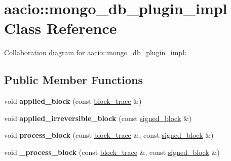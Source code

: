 \hypertarget{classaacio_1_1mongo__db__plugin__impl}{}\section{aacio\+:\+:mongo\+\_\+db\+\_\+plugin\+\_\+impl Class Reference}
\label{classaacio_1_1mongo__db__plugin__impl}


Collaboration diagram for aacio\+:\+:mongo\+\_\+db\+\_\+plugin\+\_\+impl\+:
\subsection*{Public Member Functions}
\begin{DoxyCompactItemize}
\item 
\mbox{\label{classaacio_1_1mongo__db__plugin__impl_a9fdf45ed19fc31c0c6c5b1d55e9a9f2f}} 
void {\bfseries applied\+\_\+block} (const \mbox{\hyperlink{structaacio_1_1chain_1_1block__trace}{block\+\_\+trace}} \&)
\item 
\mbox{\label{classaacio_1_1mongo__db__plugin__impl_a1d9076dbecfd18b52bbedf8028b81275}} 
void {\bfseries applied\+\_\+irreversible\+\_\+block} (const \mbox{\hyperlink{structaacio_1_1chain_1_1signed__block}{signed\+\_\+block}} \&)
\item 
\mbox{\label{classaacio_1_1mongo__db__plugin__impl_a52b7e7ccf0d26366872ae73a27eaf4f9}} 
void {\bfseries process\+\_\+block} (const \mbox{\hyperlink{structaacio_1_1chain_1_1block__trace}{block\+\_\+trace}} \&, const \mbox{\hyperlink{structaacio_1_1chain_1_1signed__block}{signed\+\_\+block}} \&)
\item 
\mbox{\label{classaacio_1_1mongo__db__plugin__impl_a09df4b18705f0c664b6d9abcc57176eb}} 
void {\bfseries \+\_\+process\+\_\+block} (const \mbox{\hyperlink{structaacio_1_1chain_1_1block__trace}{block\+\_\+trace}} \&, const \mbox{\hyperlink{structaacio_1_1chain_1_1signed__block}{signed\+\_\+block}} \&)
\item 
\mbox{\label{classaacio_1_1mongo__db__plugin__impl_a0989bb164cfd4c8e2469d3bf5b15146d}} 

\end{DoxyCompactItemize}
